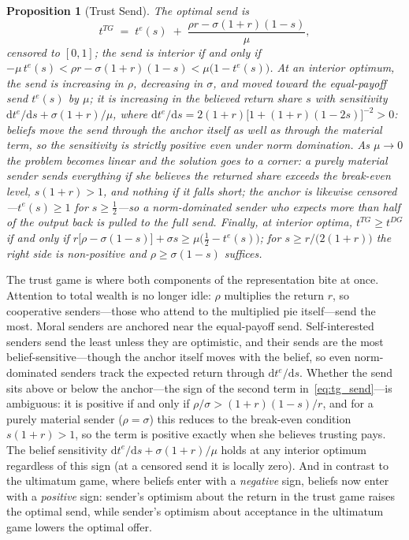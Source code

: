 \documentclass[11pt]{article}
\theoremstyle{plain}
\newtheorem{proposition}{Proposition}
\theoremstyle{remark}
\begin{document}
\begin{proposition}[Trust Send]
\label{prop:tg}
The optimal send is
\begin{equation}
t^{TG}\;=\;t^{e}(s)\;+\;\frac{\rho r-\sigma(1+r)(1-s)}{\mu},
\label{eq:tg_send}
\end{equation}
censored to $[0,1]$; the send is interior if and only if $-\mu\,t^{e}(s)<\rho r-\sigma(1+r)(1-s)<\mu\bigl(1-t^{e}(s)\bigr)$. At an interior optimum, the send is increasing in $\rho$, decreasing in $\sigma$, and moved toward the equal-payoff send $t^{e}(s)$ by $\mu$; it is increasing in the believed return share $s$ with sensitivity $\mathrm{d}t^{e}/\mathrm{d}s+\sigma(1+r)/\mu$, where $\mathrm{d}t^{e}/\mathrm{d}s=2(1+r)\bigl[1+(1+r)(1-2s)\bigr]^{-2}>0$: beliefs move the send through the anchor itself as well as through the material term, so the sensitivity is strictly positive even under norm domination. As $\mu\to 0$ the problem becomes linear and the solution goes to a corner: a purely material sender sends everything if she believes the returned share exceeds the break-even level, $s(1+r)>1$, and nothing if it falls short; the anchor is likewise censored---$t^{e}(s)\ge1$ for $s\ge\tfrac12$---so a norm-dominated sender who expects more than half of the output back is pulled to the full send. Finally, at interior optima, $t^{TG}\ge t^{DG}$ if and only if $r\bigl[\rho-\sigma(1-s)\bigr]+\sigma s\ge\mu\bigl(\tfrac12-t^{e}(s)\bigr)$; for $s\ge r/\bigl(2(1+r)\bigr)$ the right side is non-positive and $\rho\ge\sigma(1-s)$ suffices.
\end{proposition}

The trust game is where both components of the representation bite at once. Attention to total wealth is no longer idle: $\rho$ multiplies the return $r$, so cooperative senders---those who attend to the multiplied pie itself---send the most. Moral senders are anchored near the equal-payoff send. Self-interested senders send the least unless they are optimistic, and their sends are the most belief-sensitive---though the anchor itself moves with the belief, so even norm-dominated senders track the expected return through $\mathrm{d}t^{e}/\mathrm{d}s$. Whether the send sits above or below the anchor---the sign of the second term in~\eqref{eq:tg_send}---is ambiguous: it is positive if and only if $\rho/\sigma>(1+r)(1-s)/r$, and for a purely material sender ($\rho=\sigma$) this reduces to the break-even condition $s(1+r)>1$, so the term is positive exactly when she believes trusting pays. The belief sensitivity $\mathrm{d}t^{e}/\mathrm{d}s+\sigma(1+r)/\mu$ holds at any interior optimum regardless of this sign (at a censored send it is locally zero). And in contrast to the ultimatum game, where beliefs enter with a \emph{negative} sign, beliefs now enter with a \emph{positive} sign: sender's optimism about the return in the trust game raises the optimal send, while sender's optimism about acceptance in the ultimatum game lowers the optimal offer. 
\end{document}
